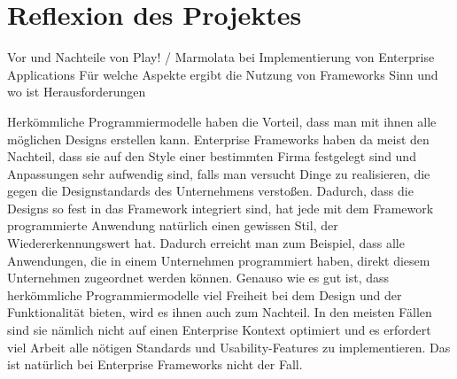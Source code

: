 \section{Reflexion des Projektes}
Vor und Nachteile von Play! / Marmolata bei Implementierung von Enterprise Applications
Für welche Aspekte ergibt die Nutzung von Frameworks Sinn und wo ist Herausforderungen

Herkömmliche Programmiermodelle haben die Vorteil, dass man mit ihnen alle möglichen Designs erstellen kann. Enterprise Frameworks haben da meist den Nachteil, dass sie auf den Style einer bestimmten Firma festgelegt sind und Anpassungen sehr aufwendig sind, falls man versucht Dinge zu realisieren, die gegen die Designstandards des Unternehmens verstoßen. Dadurch, dass die Designs so fest in das Framework integriert sind, hat jede mit dem Framework programmierte Anwendung natürlich einen gewissen Stil, der Wiedererkennungswert hat. Dadurch erreicht man zum Beispiel, dass alle Anwendungen, die in einem Unternehmen programmiert haben, direkt diesem Unternehmen zugeordnet werden können. 
Genauso wie es gut ist, dass herkömmliche Programmiermodelle viel Freiheit bei dem Design und der Funktionalität bieten, wird es ihnen auch zum Nachteil. In den meisten Fällen sind sie nämlich nicht auf einen Enterprise Kontext optimiert und es erfordert viel Arbeit alle nötigen Standards und Usability-Features zu implementieren. Das ist natürlich bei Enterprise Frameworks nicht der Fall.

\cite{example}